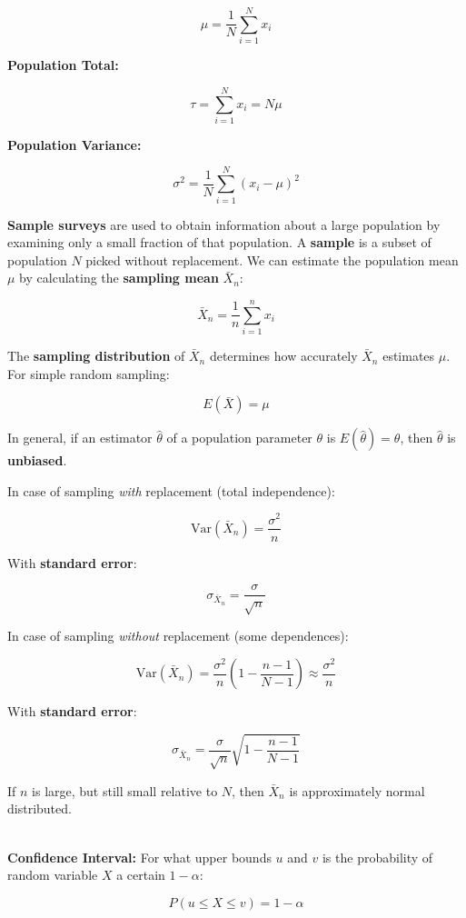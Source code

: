 \documentclass[12pt]{article}
\begin{document}
\[ \mu = \frac{1}{N} \sum_{i = 1}^{N} x_i \]

\noindent
\textbf{Population Total:}

\[ \tau = \sum_{i = 1}^{N} x_i = N \mu \]

\noindent
\textbf{Population Variance:}

\[ \sigma^2 = \frac{1}{N} \sum_{i = 1}^{N} (x_i - \mu)^2 \]

\noindent
\textbf{Sample surveys} are used to obtain information about a large population by examining only a small fraction of that population.
A \textbf{sample} is a subset of population $N$ picked without replacement.
We can estimate the population mean $\mu$ by calculating the \textbf{sampling mean} $\bar{X}_n$:

\[ \bar{X}_n = \frac{1}{n} \sum_{i = 1}^{n} x_i \]

\noindent
The \textbf{sampling distribution} of $\bar{X}_n$ determines how accurately $\bar{X}_n$ estimates $\mu$.
For simple random sampling:

\[ E(\bar{X}) = \mu \]

\noindent
In general, if an estimator $\hat{\theta}$ of a population parameter $\theta$ is $E(\hat{\theta}) = \theta$, then $\hat{\theta}$ is \textbf{unbiased}.

\newpage
\noindent
In case of sampling \textit{with} replacement (total independence):

\[ \text{Var}(\bar{X}_n) = \frac{\sigma^2}{n} \]

\noindent
With \textbf{standard error}:

\[ \sigma_{\bar{X}_n} = \frac{\sigma}{\sqrt{n}} \]

\noindent
In case of sampling \textit{without} replacement (some dependences):

\[ \text{Var}(\bar{X}_n) = \frac{\sigma^2}{n} \left( 1 - \frac{n - 1}{N - 1} \right) \approx \frac{\sigma^2}{n} \]

\noindent
With \textbf{standard error}:

\[ \sigma_{\bar{X}_n} = \frac{\sigma}{\sqrt{n}} \sqrt{1 - \frac{n - 1}{N - 1}} \]

\noindent
If $n$ is large, but still small relative to $N$, then $\bar{X}_n$ is approximately normal distributed.

\noindent
\\
\textbf{Confidence Interval:}
For what upper bounds $u$ and $v$ is the probability of random variable $X$ a certain $1 - \alpha$:

\[ P(u \leq X \leq v) = 1 - \alpha \]
\end{document}
